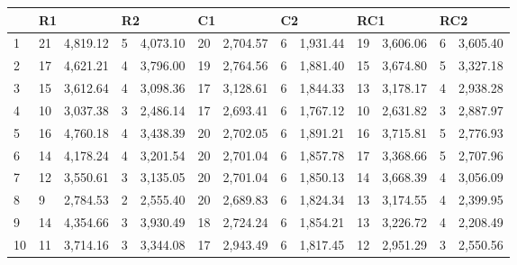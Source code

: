 \begin{table}[caption={Best Results, 200 Locations}, label=tab:2]
    \begin{tabular}{lllllllllllll}
        \toprule
        & \multicolumn{2}{l}{R1} & \multicolumn{2}{l}{R2} & \multicolumn{2}{l}{C1} & \multicolumn{2}{l}{C2} & \multicolumn{2}{l}{RC1} & \multicolumn{2}{l}{RC2} \\
        \midrule
        1  & 21 & 4,819.12 & 5 & 4,073.10 & 20 & 2,704.57 & 6 & 1,931.44 & 19 & 3,606.06 & 6 & 3,605.40 \\
        2  & 17 & 4,621.21 & 4 & 3,796.00 & 19 & 2,764.56 & 6 & 1,881.40 & 15 & 3,674.80 & 5 & 3,327.18 \\
        3  & 15 & 3,612.64 & 4 & 3,098.36 & 17 & 3,128.61 & 6 & 1,844.33 & 13 & 3,178.17 & 4 & 2,938.28 \\
        4  & 10 & 3,037.38 & 3 & 2,486.14 & 17 & 2,693.41 & 6 & 1,767.12 & 10 & 2,631.82 & 3 & 2,887.97 \\
        5  & 16 & 4,760.18 & 4 & 3,438.39 & 20 & 2,702.05 & 6 & 1,891.21 & 16 & 3,715.81 & 5 & 2,776.93 \\
        6  & 14 & 4,178.24 & 4 & 3,201.54 & 20 & 2,701.04 & 6 & 1,857.78 & 17 & 3,368.66 & 5 & 2,707.96 \\
        7  & 12 & 3,550.61 & 3 & 3,135.05 & 20 & 2,701.04 & 6 & 1,850.13 & 14 & 3,668.39 & 4 & 3,056.09 \\
        8  & 9  & 2,784.53 & 2 & 2,555.40 & 20 & 2,689.83 & 6 & 1,824.34 & 13 & 3,174.55 & 4 & 2,399.95 \\
        9  & 14 & 4,354.66 & 3 & 3,930.49 & 18 & 2,724.24 & 6 & 1,854.21 & 13 & 3,226.72 & 4 & 2,208.49 \\
        10 & 11 & 3,714.16 & 3 & 3,344.08 & 17 & 2,943.49 & 6 & 1,817.45 & 12 & 2,951.29 & 3 & 2,550.56 \\
    \end{tabular} \\
\end{table}





